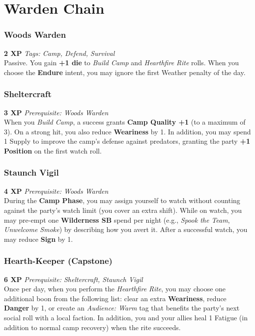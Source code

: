 \documentclass[11pt]{article}
\begin{document}
\section{Warden Chain}

\subsubsection{Woods Warden}
\textbf{2 XP} \hfill \textit{Tags: Camp, Defend, Survival}\\
Passive. You gain \textbf{+1 die} to \emph{Build Camp} and \emph{Hearthfire Rite} rolls. When you choose the \textbf{Endure} intent, you may ignore the first Weather penalty of the day.

\subsubsection{Sheltercraft}
\textbf{3 XP} \hfill \textit{Prerequisite: Woods Warden}\\
When you \emph{Build Camp}, a success grants \textbf{Camp Quality +1} (to a maximum of 3). On a strong hit, you also reduce \textbf{Weariness} by 1. In addition, you may spend 1 Supply to improve the camp's defense against predators, granting the party \textbf{+1 Position} on the first watch roll.

\subsubsection{Staunch Vigil}
\textbf{4 XP} \hfill \textit{Prerequisite: Woods Warden}\\
During the \textbf{Camp Phase}, you may assign yourself to watch without counting against the party's watch limit (you cover an extra shift). While on watch, you may pre-empt one \textbf{Wilderness SB} spend per night (e.g., \emph{Spook the Team}, \emph{Unwelcome Smoke}) by describing how you avert it. After a successful watch, you may reduce \textbf{Sign} by 1.

\subsubsection{Hearth-Keeper (Capstone)}
\textbf{6 XP} \hfill \textit{Prerequisite: Sheltercraft, Staunch Vigil}\\
Once per day, when you perform the \emph{Hearthfire Rite}, you may choose one additional boon from the following list: clear an extra \textbf{Weariness}, reduce \textbf{Danger} by 1, or create an \emph{Audience: Warm} tag that benefits the party's next social roll with a local faction. In addition, you and your allies heal 1 Fatigue (in addition to normal camp recovery) when the rite succeeds.
\end{document}
